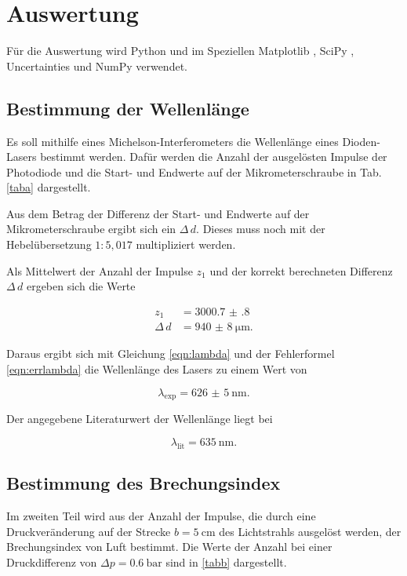 \section{Auswertung}
\label{sec:Auswertung}

Für die Auswertung wird Python und im Speziellen
Matplotlib \cite{matplotlib}, SciPy \cite{scipy},
Uncertainties \cite{uncertainties} und NumPy \cite{numpy} verwendet.

\subsection{Bestimmung der Wellenlänge}
Es soll mithilfe eines Michelson-Interferometers die Wellenlänge eines Dioden-Lasers bestimmt werden. 
Dafür werden die Anzahl der ausgelösten Impulse der Photodiode und die Start- und Endwerte auf der Mikrometerschraube in Tab. \ref{taba} dargestellt.  



\noindent Aus dem Betrag der Differenz der Start- und Endwerte auf der Mikrometerschraube ergibt sich ein $\Delta \, d$. Dieses muss noch mit der Hebelübersetzung $1:5,017$  multipliziert werden. 

\noindent Als Mittelwert der Anzahl der Impulse $z_1$ und der korrekt berechneten Differenz $\Delta \, d$ ergeben sich die Werte 

\begin{align*} 
   z_1 &= \num{3000.7(8)} \\
   \Delta \, d &= \SI{940(8)}{\micro\meter}.
\end{align*}

\noindent Daraus ergibt sich mit Gleichung \eqref{eqn:lambda} und der Fehlerformel \eqref{eqn:errlambda} die Wellenlänge des Lasers zu einem Wert von 

\begin{equation*}
    \lambda_\text{exp} = \SI{626(5)}{\nano\meter}.
\end{equation*}

\noindent Der angegebene Literaturwert der Wellenlänge liegt bei 

\begin{equation*}
    \lambda_\text{lit} = \SI{635}{\nano\meter}.
\end{equation*}

\subsection{Bestimmung des Brechungsindex}
Im zweiten Teil wird aus der Anzahl der Impulse, die durch eine Druckveränderung auf der Strecke $b = \SI{5}{\centi\meter}$ des Lichtstrahls ausgelöst werden, der Brechungsindex von Luft bestimmt. 
Die Werte der Anzahl bei einer Druckdifferenz von $\Delta p = \SI{0.6}{\bar}$ sind in \ref{tabb} dargestellt.

